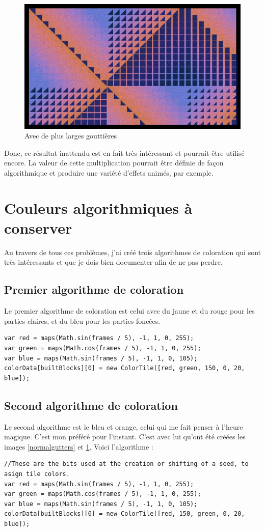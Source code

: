 \begin{figure}[h]
\includegraphics[width=1\textwidth]{images/pavage001.jpg}
\caption{Avec de plus larges gouttières}
\label{largegutters}
\end{figure}
Donc, ce résultat inattendu est en fait très intéressant et pourrait être utilisé encore. La valeur de cette multiplication pourrait être définie de façon algorithmique et produire une variété d'effets animés, par exemple.

\newpage
\section{Couleurs algorithmiques à conserver}
Au travers de tous ces problèmes, j'ai créé trois algorithmes de coloration qui sont très intéressants et que je dois bien documenter afin de ne pas perdre.

\subsection{Premier algorithme de coloration}
Le premier algorithme de coloration est celui avec du jaune et du rouge pour les parties claires, et du bleu pour les parties foncées.
\begin{lstlisting}
var red = maps(Math.sin(frames / 5), -1, 1, 0, 255);
var green = maps(Math.cos(frames / 5), -1, 1, 0, 255);
var blue = maps(Math.sin(frames / 5), -1, 1, 0, 105);
colorData[builtBlocks][0] = new ColorTile([red, green, 150, 0, 20, blue]);
\end{lstlisting}
\subsection{Second algorithme de coloration}
Le second algorithme est le bleu et orange, celui qui me fait penser à l'heure magique. C'est mon préféré pour l'instant. C'est avec lui qu'ont été créées les images \ref{normalgutters} et \ref{largegutters}. Voici l'algorithme : 
\begin{lstlisting}
//These are the bits used at the creation or shifting of a seed, to asign tile colors.
var red = maps(Math.sin(frames / 5), -1, 1, 0, 255);
var green = maps(Math.cos(frames / 5), -1, 1, 0, 255);
var blue = maps(Math.sin(frames / 5), -1, 1, 0, 105);
colorData[builtBlocks][0] = new ColorTile([red, 150, green, 0, 20, blue]);
\end{lstlisting}

